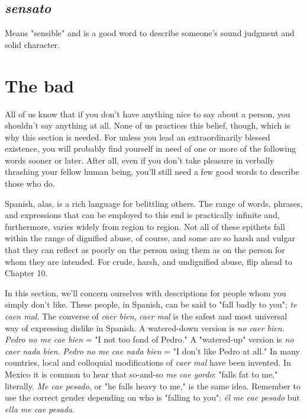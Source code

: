 \documentclass[14pt,a4paper,oneside]{memoir}
\begin{document}
\subsection{\emph{sensato}}

Means "sensible" and is a good word to describe
someone's sound judgment and solid character.

\section{The bad}

All of us know that if you don't have anything nice to say
about a person, you shouldn't say anything at all. None of us practices
this belief, though, which is why this section is needed. For unless you
lead an extraordinarily blessed existence, you will probably find yourself in need of one or more of the following words sooner or later. After
all, even if you don't take pleasure in verbally thrashing your fellow
human being, you'll still need a few good words to describe those
who do.

Spanish, alas, is a rich language for belittling others. The range
of words, phrases, and expressions that can be employed to this end is
practically infinite and, furthermore, varies widely from region to region. Not all of these epithets fall within the range of dignified abuse,
of course, and some are so harsh and vulgar that they can reflect as
poorly on the person using them as on the person for whom they are
intended. For crude, harsh, and undignified abuse, flip ahead to
Chapter 10.

In this section, we'll concern ourselves with descriptions for
people whom you simply don't like. These people, in Spanish, can be
said to "fall badly to you"; \emph{te caen mal}. The converse of \emph{caer bien},
\emph{caer mal} is the safest and most universal way of expressing dislike in
Spanish. A watered-down version is \emph{no caer bien}. \emph{Pedro no me cae
	bien} = "I not too fond of Pedro." A "watered-up" version is \emph{no caer
	nada bien}. \emph{Pedro no me cae nada bien} = "I don't like Pedro at all." In
many countries, local and colloquial modifications of \emph{caer mal} have
been invented. In Mexico it is common to hear that so-and-so \emph{me cae
	gordo}: "falls fat to me," literally. \emph{Me cae pesado}, or "he falls heavy to
me," is the same idea. Remember to use the correct gender depending
on who is "falling to you": \emph{él me cae pesado} but \emph{ella me cae pesada}.
\end{document}
